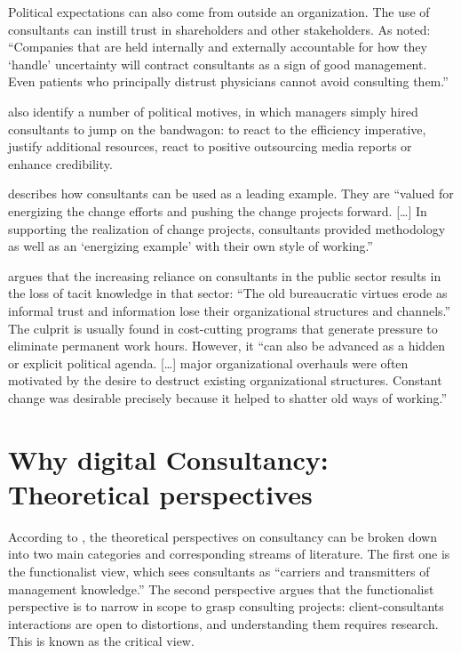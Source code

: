 \documentclass[12pt]{article}
\begin{document}
Political expectations can also come from outside an organization. The
use of consultants can instill trust in shareholders and other
stakeholders. As \citet[70]{kieser2006} noted: ``Companies that are held
internally and externally accountable for how they `handle' uncertainty
will contract consultants as a sign of good management. Even patients
who principally distrust physicians cannot avoid consulting them.''

\citet[258]{lacity1993} also identify a number of political motives, in
which managers simply hired consultants to jump on the bandwagon: to
react to the efficiency imperative, justify additional resources, react
to positive outsourcing media reports or enhance credibility.

\citet[54]{werr2002} describes how consultants can be used as a leading
example. They are ``valued for energizing the change efforts and pushing
the change projects forward. {[}\ldots{]} In supporting the realization
of change projects, consultants provided methodology as well as an
`energizing example' with their own style of working.''

\citet[250]{ylonen2019} argues that the increasing reliance on
consultants in the public sector results in the loss of tacit knowledge
in that sector: ``The old bureaucratic virtues erode as informal trust
and information lose their organizational structures and channels.'' The
culprit is usually found in cost-cutting programs that generate pressure
to eliminate permanent work hours. However, it ``can also be advanced as
a hidden or explicit political agenda. {[}\ldots{]} major organizational
overhauls were often motivated by the desire to destruct existing
organizational structures. Constant change was desirable precisely
because it helped to shatter old ways of working.''

\section{Why digital Consultancy: Theoretical
perspectives}\label{why-digital-consultancy-theoretical-perspectives}

According to \citet[3-6]{armbruster2006}, the theoretical perspectives
on consultancy can be broken down into two main categories and
corresponding streams of literature. The first one is the functionalist
view, which sees consultants as ``carriers and transmitters of
management knowledge.'' The second perspective argues that the
functionalist perspective is to narrow in scope to grasp consulting
projects: client-consultants interactions are open to distortions, and
understanding them requires research. This is known as the critical
view.
\end{document}

